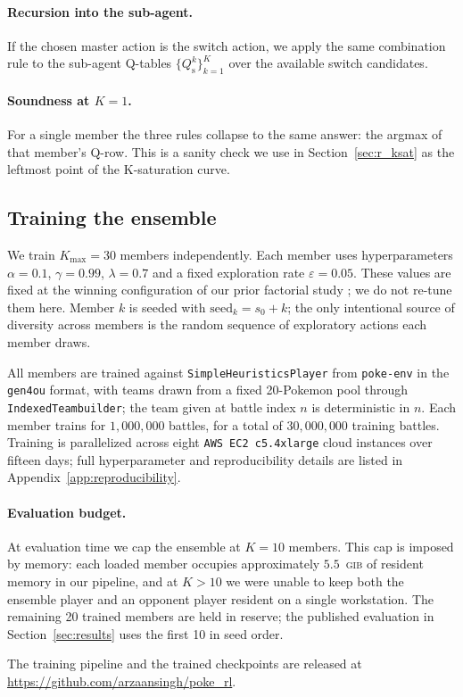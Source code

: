 \paragraph{Recursion into the sub-agent.}
If the chosen master action is the switch action, we apply the same
combination rule to the sub-agent Q-tables
$\{Q^k_{\text{s}}\}_{k=1}^K$ over the available switch candidates.

\paragraph{Soundness at $K = 1$.}
For a single member the three rules collapse to the same answer: the
argmax of that member's Q-row. This is a sanity check we use in
Section~\ref{sec:r_ksat} as the leftmost point of the K-saturation curve.

\subsection{Training the ensemble}
\label{sec:method_training}

We train $K_{\max} = 30$ members independently. Each member uses
hyperparameters $\alpha = 0.1$, $\gamma = 0.99$, $\lambda = 0.7$ and a
fixed exploration rate $\varepsilon = 0.05$. These values are fixed at
the winning configuration of our prior factorial study
\citep{singh2026v5}; we do not re-tune them here. Member $k$ is seeded
with $\text{seed}_k = s_0 + k$; the only intentional source of diversity
across members is the random sequence of exploratory actions each member
draws.

All members are trained against \texttt{SimpleHeuristicsPlayer} from
\texttt{poke-env} \citep{sahovic2020pokeenv} in the
\texttt{gen4ou} format, with teams drawn from a fixed 20-Pokemon pool
through \texttt{IndexedTeambuilder}; the team given at battle index $n$
is deterministic in $n$. Each member trains for $1{,}000{,}000$ battles,
for a total of $30{,}000{,}000$ training battles. Training is
parallelized across eight \texttt{AWS EC2 c5.4xlarge} cloud instances
over fifteen days; full hyperparameter and reproducibility details are
listed in Appendix~\ref{app:reproducibility}.

\paragraph{Evaluation budget.}
At evaluation time we cap the ensemble at $K = 10$ members. This cap is
imposed by memory: each loaded member occupies approximately
$5.5$~\textsc{gib} of resident memory in our pipeline, and at $K > 10$ we
were unable to keep both the ensemble player and an opponent player
resident on a single workstation. The remaining 20 trained members are
held in reserve; the published evaluation in Section~\ref{sec:results}
uses the first 10 in seed order.

The training pipeline and the trained checkpoints are released at
\url{https://github.com/arzaansingh/poke_rl}.
